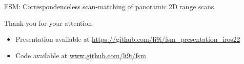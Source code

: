 \begin{frame}[noframenumbering]{FSM: Correspondenceless scan-matching of panoramic 2D range scans}

\begin{center}
  Thank you for your attention
\end{center}

  \vspace{2cm}

  \begin{itemize}
    \item \scriptsize Presentation available at \url{https://github.com/li9i/fsm\_presentation\_iros22}
    \item \scriptsize Code available at \url{www.github.com/li9i/fsm}
  \end{itemize}

\end{frame}
